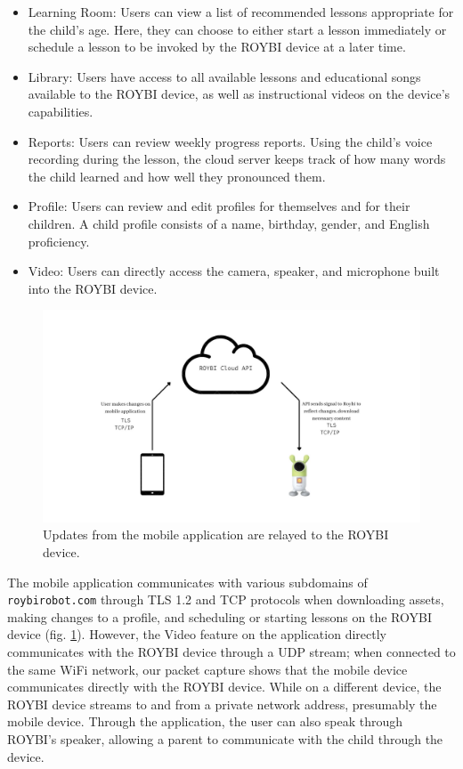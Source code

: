 \documentclass[12pt]{ucthesis}
\begin{document}
\begin{itemize}
    \item Learning Room: Users can view a list of recommended lessons appropriate for the child's age. Here, they can choose to either start a lesson immediately or schedule a lesson to be invoked by the ROYBI device at a later time.
    \item Library: Users have access to all available lessons and educational songs available to the ROYBI device, as well as instructional videos on the device's capabilities.
    \item Reports: Users can review weekly progress reports. Using the child's voice recording during the lesson, the cloud server keeps track of how many words the child learned and how well they pronounced them.
    \item Profile: Users can review and edit profiles for themselves and for their children. A child profile consists of a name, birthday, gender, and English proficiency.
    \item Video: Users can directly access the camera, speaker, and microphone built into the ROYBI device.
\end{itemize}

\begin{figure}
    \includegraphics[width=\textwidth]{changes on app.jpg}
    \caption{Updates from the mobile application are relayed to the ROYBI device.}
    \label{fig:roybiapp}
\end{figure}

The mobile application communicates with various subdomains of \texttt{roybirobot.com} through TLS 1.2 and TCP protocols when downloading assets, making changes to a profile, and scheduling or starting lessons on the ROYBI device (fig. \ref{fig:roybiapp}). However, the Video feature on the application directly communicates with the ROYBI device through a UDP stream; when connected to the same WiFi network, our packet capture shows that the mobile device communicates directly with the ROYBI device. While on a different device, the ROYBI device streams to and from a private network address, presumably the mobile device. Through the application, the user can also speak through ROYBI's speaker, allowing a parent to communicate with the child through the device.
\end{document}
